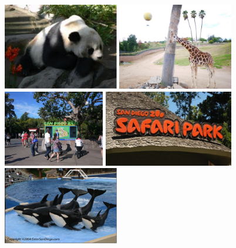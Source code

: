 \documentclass[10pt,a4paper]{book}
\begin{document}
\begin{CJK}{UTF8}{bkai}
\begin{figure}[H]
\centering
\includegraphics[width=0.45\textwidth]{Pics/san_diego_zoo}
\includegraphics[width=0.45\textwidth]{Pics/sdzoo1}\\
\includegraphics[width=0.395\textwidth]{Pics/sdzoo2}
\includegraphics[width=0.505\textwidth]{Pics/safari_park}\\
\includegraphics[width=0.45\textwidth]{Pics/sea_world}

\end{figure}
\end{CJK}
\end{document}
